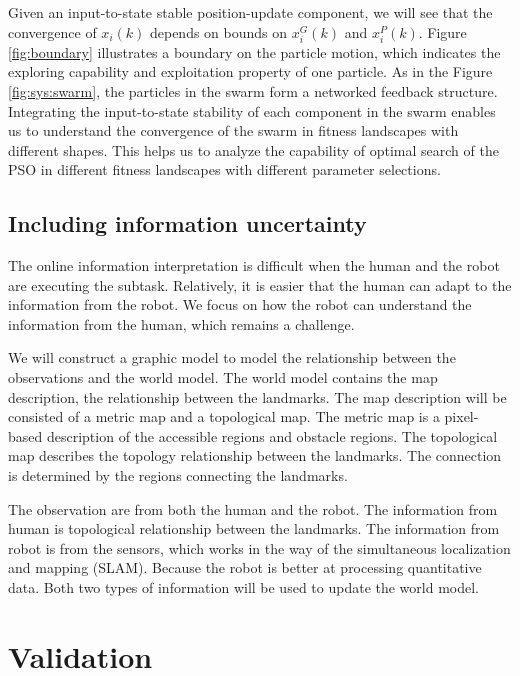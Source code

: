 \documentclass[phd]{byuprop}
\begin{document}
Given an input-to-state stable position-update component, we will see that the convergence of $ x_{i}(k) $ depends on bounds on $ x^{G}_{i}(k) $ and $ x^{P}_{i}(k) $.
Figure \ref{fig:boundary} illustrates a boundary on the particle motion, which indicates the exploring capability and exploitation property of one particle.
As in the Figure \ref{fig:sys:swarm}, the particles in the swarm form a networked feedback structure.
Integrating the input-to-state stability of each component in the swarm enables us to understand the convergence of the swarm in fitness landscapes with different shapes.
This helps us to analyze the capability of optimal search of the PSO in different fitness landscapes with different parameter selections.

\subsection{Including information uncertainty}

The online information interpretation is difficult when the human and the robot are executing the subtask.
Relatively, it is easier that the human can adapt to the information from the robot.
We focus on how the robot can understand the information from the human, which remains a challenge.

We will construct a graphic model to model the relationship between the observations and the world model.
The world model contains the map description, the relationship between the landmarks.
The map description will be consisted of a metric map and a topological map.
The metric map is a pixel-based description of the accessible regions and obstacle regions.
The topological map describes the topology relationship between the landmarks.
The connection is determined by the regions connecting the landmarks.

The observation are from both the human and the robot.
The information from human is topological relationship between the landmarks.
The information from robot is from the sensors, which works in the way of the simultaneous localization and mapping (SLAM).
Because the robot is better at processing quantitative data.
Both two types of information will be used to update the world model.  



\section{Validation}
\end{document}
